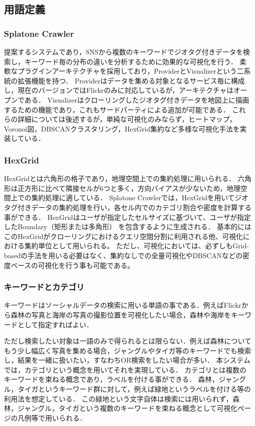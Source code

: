 \subsection{用語定義}

\subsubsection{Splatone Crawler}

提案するシステムであり，SNSから複数のキーワードでジオタグ付きデータを検索し，キーワード毎の分布の違いを分析するために効果的な可視化を行う．
柔軟なプラグインアーキテクチャを採用しており，ProviderとVisualizerという二系統の拡張機能を持つ．
Providerはデータを集める対象となるサービス毎に構成し，現在のバージョンではFlickrのみに対応しているが，アーキテクチャはオープンである．
Visualizerはクローリングしたジオタグ付きデータを地図上に描画するための機能であり，これもサードパーティによる追加が可能である．
これらの詳細については後述するが，単純な可視化のみならず，ヒートマップ，Voronoi図，DBSCANクラスタリング，HexGrid集約など多様な可視化手法を実装している．

\subsubsection{HexGrid}

HexGridとは六角形の格子であり，地理空間上での集約処理に用いられる．
六角形は正方形に比べて隣接セルが6つと多く，方向バイアスが少ないため，地理空間上での集約処理に適している．
Splatone Crawlerでは，HexGridを用いてジオタグ付きデータの集約処理を行い，各セル内でのカテゴリ割合や密度を計算する事ができる．
HexGridはユーザが指定したセルサイズに基づいて、ユーザが指定したBoundary（矩形または多角形）
を包含するように生成される．
基本的にはこのHexGridがクローリングにおけるクエリ空間分割に利用される他、可視化における集約単位として用いられる。
ただし、可視化においては、必ずしもGrid-basedの手法を用いる必要はなく、集約なしでの全量可視化やDBSCANなどの密度ベースの可視化を行う事も可能である。

\subsubsection{キーワードとカテゴリ}

キーワードはソーシャルデータの検索に用いる単語の事である．例えばFlickrから森林の写真と海岸の写真の撮影位置を可視化したい場合，森林や海岸をキーワードとして指定すればよい．

ただし検索したい対象は一語のみで得られるとは限らない．例えば森林についてもう少し幅広く写真を集める場合，ジャングルやタイガ等のキーワードでも検索し，結果を一緒に扱いたい，すなわちOR検索をしたい場合が多い．
本システムでは，カテゴリという概念を用いてそれを実現している．
カテゴリとは複数のキーワードを束ねる概念であり，ラベルを付ける事ができる．
森林，ジャングル，タイガというキーワード群に対して，例えば緑地というラベルを付ける等の利用法を想定している．
この緑地という文字自体は検索には用いられず，森林，ジャングル，タイガという複数のキーワードを束ねる概念として可視化ページの凡例等で用いられる．

